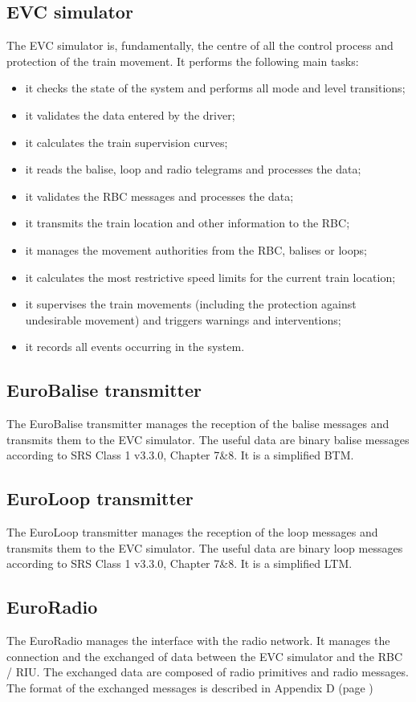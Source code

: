 \documentclass[nocc]{template/openetcs_report}
\begin{document}
\subsection{EVC simulator}
The EVC simulator is, fundamentally, the centre of all the control process and protection of the train movement. It performs the following main tasks:
\begin{itemize}
\item it checks the state of the system and performs all mode and level transitions;
\item it validates the data entered by the driver;
\item it calculates the train supervision curves;
\item it reads the balise, loop and radio telegrams and processes the data;
\item it validates the RBC messages and processes the data;
\item it transmits the train location and other information to the RBC;
\item it manages the movement authorities from the RBC, balises or loops;
\item it calculates the most restrictive speed limits for the current train location;
\item it supervises the train movements (including the protection against undesirable movement) and triggers warnings and interventions;
\item it records all events occurring in the system.
\end{itemize}
\subsection{EuroBalise transmitter}
The EuroBalise transmitter manages the reception of the balise messages and transmits them to the EVC simulator. The useful data are binary balise messages according to SRS Class 1 v3.3.0, Chapter 7\&8. It is a simplified BTM.
\subsection{EuroLoop transmitter}
The EuroLoop transmitter manages the reception of the loop messages and transmits them to the EVC simulator. The useful data are binary loop messages according to SRS Class 1 v3.3.0, Chapter 7\&8. It is a simplified LTM. 
\subsection{EuroRadio}
The EuroRadio manages the interface with the radio network. It manages the connection and the exchanged of data between the EVC simulator and the RBC / RIU. The exchanged data are composed of radio primitives and radio messages. The format of the exchanged messages is described in Appendix D (page \pageref{euroradio_data})
\end{document}
